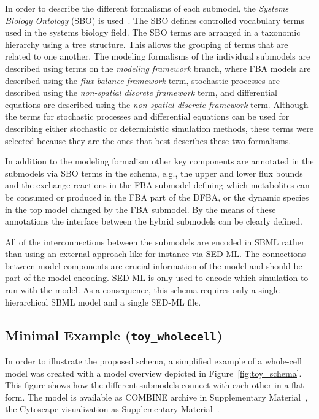 \documentclass{bioinfo}
\begin{document}
In order to describe the different formalisms of each submodel, the \emph{Systems Biology Ontology} (SBO) is used~\citep{SBO}. The SBO defines controlled vocabulary terms used in the systems biology field. The SBO terms are arranged in a taxonomic hierarchy using a tree structure. This allows the grouping of terms that are related to one another. The modeling formalisms of the individual submodels are described using terms on the \emph{modeling framework} branch, where FBA models are described using the \emph{flux balance framework} term, stochastic processes are described using the \emph{non-spatial discrete framework} term, and differential equations are described using the \emph{non-spatial discrete framework} term. Although the terms for stochastic processes and differential equations can be used for describing either stochastic or deterministic simulation methods, these terms were selected because they are the ones that best describes these two formalisms.

In addition to the modeling formalism other key components are annotated in the submodels via SBO terms in the schema, e.g., the upper and lower flux bounds and the exchange reactions in the FBA submodel defining which metabolites can be consumed or produced in the FBA part of the DFBA, or the dynamic species in the top model changed by the FBA submodel. By the means of these annotations the interface between the hybrid submodels can be clearly defined.

All of the interconnections between the submodels are encoded in SBML rather than using an external approach like for instance via SED-ML. The connections between model components are crucial information of the model and should be part of the model encoding. SED-ML is only used to encode which simulation to run with the model. As a consequence, this schema requires only a single hierarchical SBML model and a single SED-ML file.

\subsection{Minimal Example (\texttt{toy\_wholecell})}
In order to illustrate the proposed schema, a simplified example of a whole-cell model was created with a model overview depicted in Figure~\ref{fig:toy_schema}. This figure shows how the different submodels connect with each other in a flat form. The model is available as COMBINE archive in Supplementary Material~, the Cytoscape visualization as Supplementary Material~.
\end{document}

